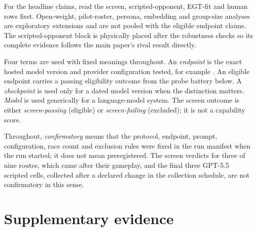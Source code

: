 \documentclass{article}
\begin{document}
For the headline claims, read the screen, scripted-opponent, EGT-fit and human
rows first. Open-weight, pilot-roster, persona, embedding and group-size
analyses are exploratory extensions and are not pooled with the eligible
endpoint claims. The scripted-opponent block is physically placed after the
robustness checks so its complete
evidence follows the main paper's rival result directly.

Four terms are used with fixed meanings throughout. An \emph{endpoint} is the
exact hosted model version and provider configuration tested, for example
. An eligible endpoint carries a passing
eligibility outcome from the probe battery below. A
\emph{checkpoint} is used only for a dated model version when the distinction
matters. \emph{Model} is used generically for a language-model system. The
screen outcome is either \emph{screen-passing} (eligible) or
\emph{screen-failing} (excluded); it is not a capability score.

Throughout, \emph{confirmatory} means that the protocol, endpoint, prompt,
configuration, race count and exclusion rules were fixed in the run manifest
when the run started; it does not mean preregistered. The screen verdicts for
three of nine routes, which came after their gameplay, and the final three
GPT-5.5 scripted cells, collected after a declared change in the collection schedule, are not
confirmatory in this sense.

\appendix
\setcounter{secnumdepth}{2}
\setcounter{tocdepth}{2}
\renewcommand{\thesection}{S\arabic{section}}
\renewcommand{\thesubsection}{\thesection.\arabic{subsection}}
\tableofcontents
\section*{Supplementary evidence}
\label{app:extended-results}

\providecommand{\todo}[1]{\textbf{[TODO: #1]}}
\end{document}
